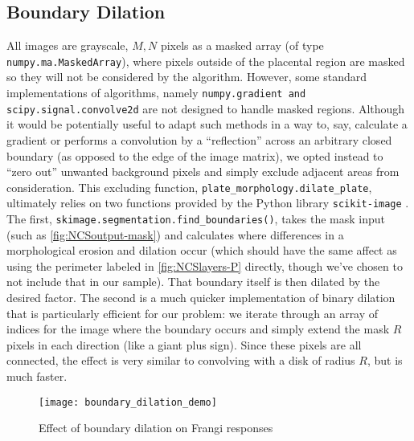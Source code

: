 	\subsection{Boundary Dilation}
	
	All images are grayscale, $M,N$ pixels as a masked array (of type
	\texttt{numpy.ma.MaskedArray}), where pixels outside of the placental region are masked so they will not be considered by the algorithm. However, some standard
	implementations of algorithms, namely \texttt{numpy.gradient and scipy.signal.convolve2d} are not designed to handle masked regions. Although it would be potentially useful to adapt such methods in a way to, say, calculate a gradient or performs a convolution by a ``reflection'' across an arbitrary closed boundary (as opposed to the edge of the image matrix), we opted instead to ``zero out'' unwanted background pixels and simply exclude adjacent areas from consideration. This excluding function, 	\texttt{plate\_morphology.dilate\_plate}, ultimately relies on two functions
	provided by the Python library \texttt{scikit-image} \cite{skimage}. The first, \texttt{skimage.segmentation.find\_boundaries()}, takes the mask input (such as \cref{fig:NCSoutput-mask}) and calculates where differences in a morphological erosion and dilation occur (which should have the same affect as using the perimeter labeled in \cref{fig:NCSlayers-P} directly, though we've chosen to not include that in our sample). That boundary itself is then dilated by the desired factor. The second is a much quicker implementation of binary dilation that is particularly efficient for our problem: we iterate through an array of indices for the image where the boundary occurs and simply extend the mask $R$ pixels in each direction (like a giant plus sign). Since these pixels are all connected, the effect is very similar to convolving with a disk of radius $R$, but is much faster.
	
	\begin{figure} 
		\texttt{[image: boundary\_dilation\_demo]}
		\caption{Effect of boundary dilation on Frangi responses}
		\label{fig:boundary-demo}
	\end{figure}
	
